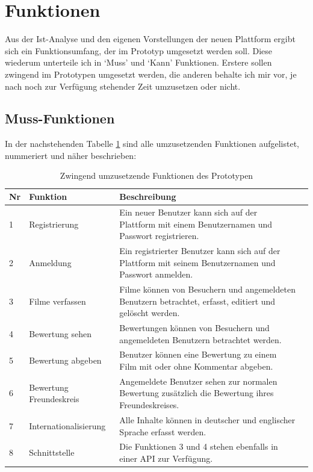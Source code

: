 \section{Funktionen}
Aus der Ist-Analyse und den eigenen Vorstellungen der neuen Plattform ergibt
sich ein Funktionsumfang, der im Prototyp umgesetzt werden soll. Diese
wiederum unterteile ich in `Muss' und `Kann' Funktionen. Erstere sollen
zwingend im Prototypen umgesetzt werden, die anderen behalte ich mir vor, je
nach noch zur Verfügung stehender Zeit umzusetzen oder nicht.

\subsection{Muss-Funktionen}\label{chp:muss_funktionen}
In der nachstehenden Tabelle \ref{tab:muss_funktionen} sind alle umzusetzenden 
Funktionen aufgelistet, nummeriert und näher beschrieben:

\begin{table}[h]
\begin{center}
    \begin{tabular}{llp{8cm}l}
        \toprule Nr & Funktion & Beschreibung \\
        \midrule 1 & Registrierung & Ein neuer Benutzer kann sich auf der Plattform
                     mit einem Benutzernamen und Passwort registrieren. \\
        \midrule 2 & Anmeldung & Ein registrierter Benutzer kann sich auf der
                     Plattform mit seinem Benutzernamen und Passwort anmelden. \\
        \midrule 3 & Filme verfassen & Filme können von Besuchern und angemeldeten Benutzern
                     betrachtet, erfasst, editiert und gelöscht werden. \\
        \midrule 4 & Bewertung sehen & Bewertungen können von Besuchern und angemeldeten Benutzern
                     betrachtet werden. \\
        \midrule 5 & Bewertung abgeben & Benutzer können eine Bewertung zu einem Film mit oder ohne
                     Kommentar abgeben. \\
        \midrule 6 & Bewertung Freundeskreis & Angemeldete Benutzer sehen zur normalen Bewertung zusätzlich
                     die Bewertung ihres Freundeskreises. \\
        \midrule 7 & Internationalisierung & Alle Inhalte können in deutscher und englischer
                     Sprache erfasst werden. \\
        \midrule 8 & Schnittstelle & Die Funktionen 3 und 4 stehen ebenfalls in einer API 
                     zur Verfügung. \\
        \bottomrule
    \end{tabular}
    \caption{Zwingend umzusetzende Funktionen des Prototypen}
    \label{tab:muss_funktionen}
\end{center}
\end{table}

